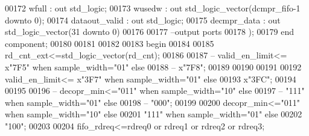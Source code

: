 \begin{DoxyCode}
00172         wfull         : \textcolor{keywordflow}{out} \textcolor{comment}{std\_logic};
00173         wusedw        : \textcolor{keywordflow}{out} \textcolor{comment}{std\_logic\_vector}(dcmpr\_fifo\textcolor{vhdlchar}{-}\textcolor{vhdllogic}{}\textcolor{vhdllogic}{1} \textcolor{keywordflow}{downto} \textcolor{vhdllogic}{}\textcolor{vhdllogic}{0});
00174         dataout_valid : \textcolor{keywordflow}{out} \textcolor{comment}{std\_logic};
00175         decmpr_data   : \textcolor{keywordflow}{out} \textcolor{comment}{std\_logic\_vector}(\textcolor{vhdllogic}{}\textcolor{vhdllogic}{31} \textcolor{keywordflow}{downto} \textcolor{vhdllogic}{}\textcolor{vhdllogic}{0}) 
00176 
00177 \textcolor{keyword}{        --output ports       }
00178         );
00179 \textcolor{keywordflow}{end} \textcolor{keywordflow}{component};
00180 
00181 
00182   
00183 \textcolor{vhdlkeyword}{begin}
00184   
00185   \textcolor{vhdlchar}{rd_cnt_ext}\textcolor{vhdlchar}{<=}\textcolor{comment}{std\_logic\_vector}\textcolor{vhdlchar}{(}\textcolor{vhdlchar}{rd_cnt}\textcolor{vhdlchar}{)};
00186   
00187 \textcolor{keyword}{-- valid\_en\_limit<= x"7F5" when sample\_width="01" else}
00188 \textcolor{keyword}{--                  x"7F8";}
00189 
00190                    
00191                      
00192   \textcolor{vhdlchar}{valid_en_limit}\textcolor{vhdlchar}{<=} \textcolor{vhdlchar}{x}\textcolor{vhdllogic}{"3F7"} \textcolor{keywordflow}{when} \textcolor{vhdlchar}{sample_width}\textcolor{vhdlchar}{=}\textcolor{vhdllogic}{"01"} \textcolor{keywordflow}{else}
00193                    \textcolor{vhdlchar}{x}\textcolor{vhdllogic}{"3FC"};
00194   
00195   
00196 \textcolor{keyword}{--  decopr\_min<="011" when sample\_width="10" else }
00197 \textcolor{keyword}{--              "111" when sample\_width="01" else}
00198 \textcolor{keyword}{--              "000";}
00199   
00200   \textcolor{vhdlchar}{decopr_min}\textcolor{vhdlchar}{<=}\textcolor{vhdllogic}{"011"} \textcolor{keywordflow}{when} \textcolor{vhdlchar}{sample_width}\textcolor{vhdlchar}{=}\textcolor{vhdllogic}{"10"} \textcolor{keywordflow}{else} 
00201               \textcolor{vhdllogic}{"111"} \textcolor{keywordflow}{when} \textcolor{vhdlchar}{sample_width}\textcolor{vhdlchar}{=}\textcolor{vhdllogic}{"01"} \textcolor{keywordflow}{else}
00202               \textcolor{vhdllogic}{"100"};
00203 
00204 \textcolor{vhdlchar}{fifo_rdreq}\textcolor{vhdlchar}{<=}\textcolor{vhdlchar}{rdreq0} \textcolor{keywordflow}{or} \textcolor{vhdlchar}{rdreq1} \textcolor{keywordflow}{or} \textcolor{vhdlchar}{rdreq2} \textcolor{keywordflow}{or} \textcolor{vhdlchar}{rdreq3};

\end{DoxyCode}
